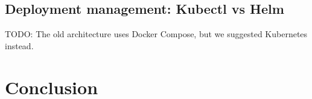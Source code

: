 \subsection{Deployment management: Kubectl vs Helm}
TODO: The old architecture uses Docker Compose, but we suggested Kubernetes instead.

\setcounter{secnumdepth}{0} %
\section{Conclusion}
\lipsum[2]
